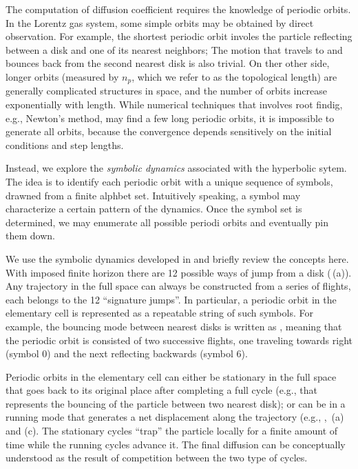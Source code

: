 


The computation of diffusion coefficient  requires
the knowledge of periodic orbits. In the Lorentz gas system, some
simple orbits may be obtained by direct observation. For example, the
shortest periodic orbit involes the particle reflecting between a disk
and one of its nearest neighbors; The motion that travels to and
bounces back from the second nearest disk is also trivial. On ther
other side, longer orbits (measured by $n_p$, which we refer to as the
topological length) are generally complicated structures in space, and
the number of orbits increase exponentially with length.  While
numerical techniques that involves root findig, e.g., Newton's method,
may find a few long periodic orbits, it is impossible to generate
all orbits, because the convergence depends sensitively on the initial
conditions and step lengths.

Instead, we explore the \emph{symbolic dynamics} associated with the
hyperbolic sytem. The idea is to identify each periodic orbit with a
unique sequence of symbols, drawned from a finite alphbet set.
Intuitively speaking, a symbol may characterize a certain pattern of
the dynamics. Once the symbol set is determined, we may enumerate all
possible periodi orbits and eventually pin them down. 

We use the symbolic dynamics developed in  and briefly
review the concepts here. With imposed finite horizon there are 12
possible ways of jump from a disk
(\,(a)). Any trajectory in the full
space can always be constructed from a series of flights, each belongs
to the 12 ``signature jumps''. In particular, a periodic orbit in the
elementary cell is represented as a repeatable string of such symbols.
For example, the bouncing mode between nearest disks is written as
, meaning that the periodic orbit is consisted of two
successive flights, one traveling towards right (symbol $0$) and the
next reflecting backwards (symbol $6$).

Periodic orbits in the elementary cell can either be stationary in the
full space that goes back to its original place after completing a
full cycle (e.g.,  that represents the bouncing of the
particle between two nearest disk); or can be in a running mode that
generates a net displacement along the trajectory (e.g., ,
\,(a) and (c). The stationary cycles
``trap'' the  particle locally for a finite amount of time while the
running cycles advance it. The final diffusion 
can be conceptually understood as the result of competition between
the two type of cycles.

